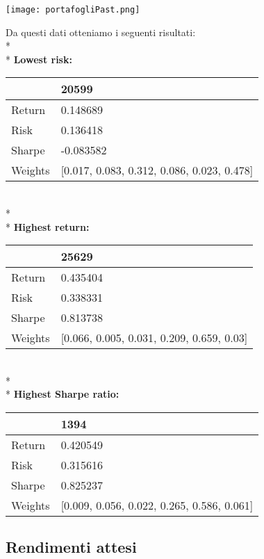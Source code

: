 \documentclass{report}
\begin{document}
\texttt{[image: portafogliPast.png]}

Da questi dati otteniamo i seguenti risultati:
\\*
\\*
\textbf{Lowest risk:}

\begin{tabular}{ll}
\toprule
{} &                                       20599 \\
\midrule
Return  &                                    0.148689 \\
Risk    &                                    0.136418 \\
Sharpe  &                                   -0.083582 \\
Weights &  [0.017, 0.083, 0.312, 0.086, 0.023, 0.478] \\
\bottomrule
\end{tabular}
\\*
\\*
\textbf{Highest return:}

\begin{tabular}{ll}
\toprule
{} &                                      25629 \\
\midrule
Return  &                                   0.435404 \\
Risk    &                                   0.338331 \\
Sharpe  &                                   0.813738 \\
Weights &  [0.066, 0.005, 0.031, 0.209, 0.659, 0.03] \\
\bottomrule
\end{tabular}
\\*
\\*
\textbf{Highest Sharpe ratio:}

\begin{tabular}{ll}
\toprule
{} &                                        1394 \\
\midrule
Return  &                                    0.420549 \\
Risk    &                                    0.315616 \\
Sharpe  &                                    0.825237 \\
Weights &  [0.009, 0.056, 0.022, 0.265, 0.586, 0.061] \\
\bottomrule
\end{tabular}

\subsection{Rendimenti attesi}
\end{document}
